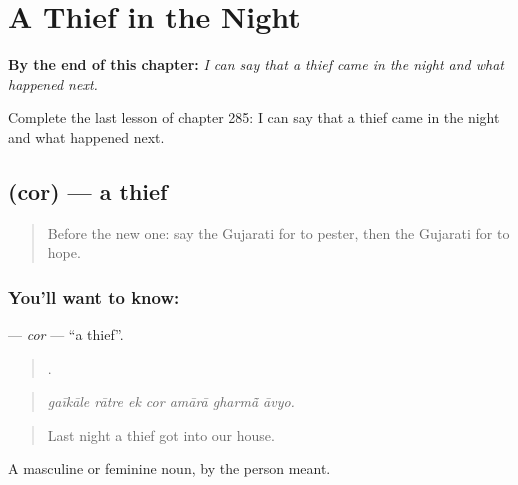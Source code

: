 
\chapter{A Thief in the Night}
\label{ch:gu-a-thief-in-the-night}

\begin{chapteropening}
\textbf{By the end of this chapter:} \emph{I can say that a thief came in the night and what happened next.}

Complete the last lesson of chapter 285: I can say that a thief came in the night and what happened next.
\end{chapteropening}

\section[\texorpdfstring{\gu{ચોર} (cor)}{ચોર (cor)}]{ (cor) — a thief}

\label{lesson:GU-C285-cor}



\begin{quote}
Before the new one: say the Gujarati for to pester, then the Gujarati for to hope.
\end{quote}

\subsection*{You'll want to know: }
\textbf{} — \emph{cor} — \textquotedblleft{}a thief\textquotedblright{}.

\begin{quote}
      .
\end{quote}

\begin{quote}
\emph{gaīkāle rātre ek cor amārā gharmā̃ āvyo.}
\end{quote}

\begin{quote}
Last night a thief got into our house.
\end{quote}

A masculine or feminine noun, by the person meant.

